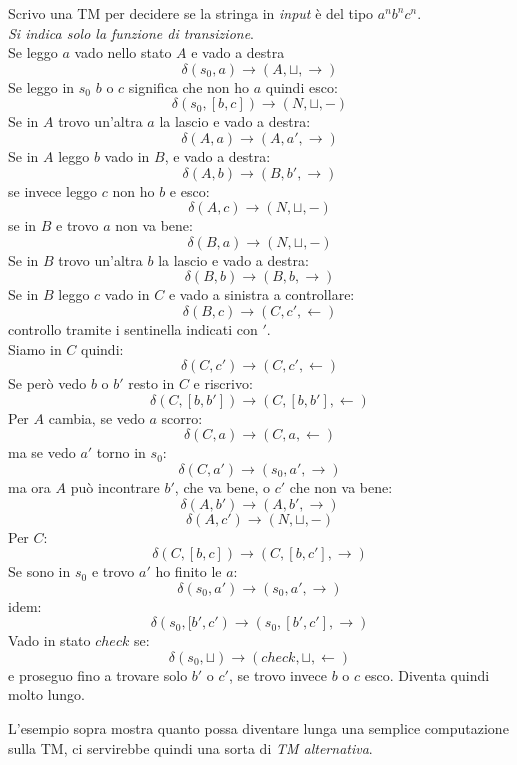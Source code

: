 \begin{esempio}
  Scrivo una TM per decidere se la stringa in \textit{input} è del tipo $a^nb^nc^n$.\\
  \textit{Si indica solo la funzione di transizione}.\\
  Se leggo $a$ vado nello stato $A$ e vado a destra
  \[\delta(s_0,a)\to (A,\sqcup, \rightarrow)\]
  Se leggo in $s_0$ $b$ o $c$ significa che non ho $a$ quindi esco:
  \[\delta(s_0,[b,c])\to (N,\sqcup, -)\]
  Se in $A$ trovo un'altra $a$ la lascio e vado a destra:
  \[\delta(A,a)\to (A,a', \rightarrow)\]
  Se in $A$ leggo $b$ vado in $B$, e vado a destra:
  \[\delta(A,b)\to (B,b', \rightarrow)\]
  se invece leggo $c$ non ho $b$ e esco:
  \[\delta(A,c)\to (N,\sqcup, -)\]
  se in $B$ e trovo $a$ non va bene:
  \[\delta(B,a)\to (N,\sqcup, -)\]
  Se in $B$ trovo un'altra $b$ la lascio e vado a destra:
  \[\delta(B,b)\to (B,b, \rightarrow)\]
  Se in $B$ leggo $c$ vado in $C$ e vado a sinistra a controllare:
  \[\delta(B,c)\to (C,c', \leftarrow)\]
  controllo tramite i sentinella indicati con $'$.\\
  Siamo in $C$ quindi:
  \[\delta(C,c')\to (C,c', \leftarrow)\]
  Se però vedo $b$ o $b'$ resto in $C$ e riscrivo:
  \[\delta(C,[b,b'])\to (C,[b,b'], \leftarrow)\]
  Per $A$ cambia, se vedo $a$ scorro:
  \[\delta(C,a)\to (C,a, \leftarrow)\]
  ma se vedo $a'$ torno in $s_0$:
  \[\delta(C,a')\to (s_0,a', \rightarrow)\]
  ma ora $A$ può incontrare $b'$, che va bene, o $c'$ che non va bene:
  \[\delta(A,b')\to (A,b', \rightarrow)\]
  \[\delta(A,c')\to (N,\sqcup, -)\]
  Per $C$:
  \[\delta(C,[b,c])\to (C,[b,c'], \rightarrow)\]
  Se sono in $s_0$ e trovo $a'$ ho finito le $a$:
  \[\delta(s_0,a')\to (s_0,a' , \rightarrow)\]
  idem:
  \[\delta(s_0,[b',c')\to (s_0,[b',c'] , \rightarrow)\]
  Vado in stato $check$ se:
  \[\delta(s_0,\sqcup)\to(check,\sqcup, \leftarrow)\]
  e proseguo fino a trovare solo $b'$ o $c'$, se trovo invece $b$ o $c$ esco.
  Diventa quindi molto lungo.
\end{esempio}
L'esempio sopra mostra quanto possa diventare lunga una semplice computazione
sulla TM, ci servirebbe quindi una sorta di \textit{TM alternativa}.
